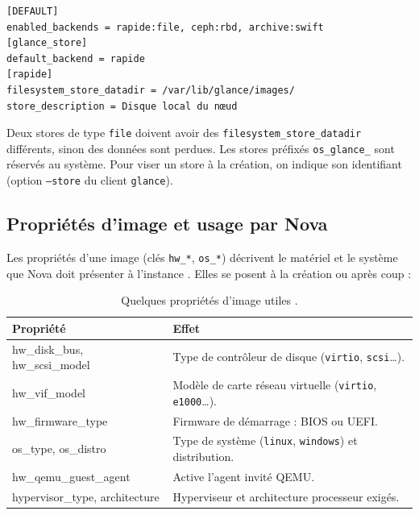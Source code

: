 \par\noindent\begin{minipage}{\linewidth}
\begin{lstlisting}
[DEFAULT]
enabled_backends = rapide:file, ceph:rbd, archive:swift
[glance_store]
default_backend = rapide
[rapide]
filesystem_store_datadir = /var/lib/glance/images/
store_description = Disque local du nœud
\end{lstlisting}
\end{minipage}\par

Deux stores de type \texttt{file} doivent avoir des \texttt{filesystem\_store\_datadir} différents, sinon des données sont
perdues. Les stores préfixés \texttt{os\_glance\_} sont réservés au système. Pour viser un store à la création, on
indique son identifiant (option \texttt{--store} du client \texttt{glance}).

\subsection{Propriétés d'image et usage par Nova}\label{sec:gl-proprietes}

Les propriétés d'une image (clés \texttt{hw\_*}, \texttt{os\_*}) décrivent le matériel et le système que Nova doit
présenter à l'instance \parencite{glance-properties}. Elles se posent à la création ou après coup :

\begin{table}[!ht]
\centering
\renewcommand{\arraystretch}{1.3}
\begin{tabular}{@{}>{\raggedright\arraybackslash\ttfamily}p{3.4cm}>{\raggedright\arraybackslash}p{12.1cm}@{}}
\toprule
\textrm{\textbf{Propriété}} & \textbf{Effet} \\
\midrule
hw\_disk\_bus, hw\_scsi\_model & Type de contrôleur de disque (\texttt{virtio}, \texttt{scsi}\dots). \\
hw\_vif\_model & Modèle de carte réseau virtuelle (\texttt{virtio}, \texttt{e1000}\dots). \\
hw\_firmware\_type & Firmware de démarrage : BIOS ou UEFI. \\
os\_type, os\_distro & Type de système (\texttt{linux}, \texttt{windows}) et distribution. \\
hw\_qemu\_\allowbreak guest\_agent & Active l'agent invité QEMU. \\
hypervisor\_type, architecture & Hyperviseur et architecture processeur exigés. \\
\bottomrule
\end{tabular}
\caption{Quelques propriétés d'image utiles \parencite{glance-properties}.}
\label{tab:gl-proprietes}
\end{table}

